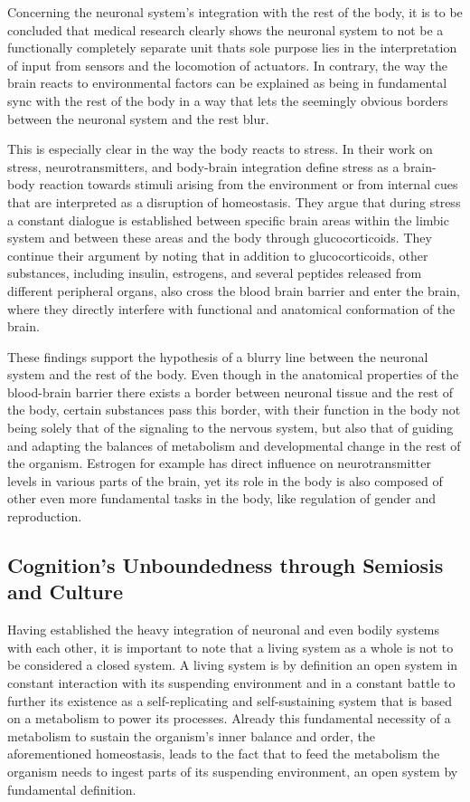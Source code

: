 Concerning the neuronal system's integration with the rest of the body, it is to be concluded that medical research clearly shows the neuronal system to not be a functionally completely separate unit thats sole purpose lies in the interpretation of input from sensors and the locomotion of actuators. In contrary, the way the brain reacts to environmental factors can be explained as being in fundamental sync with the rest of the body in a way that lets the seemingly obvious borders between the neuronal system and the rest blur.

This is especially clear in the way the body reacts to stress. In their work on stress, neurotransmitters, and body-brain integration \citet{Mora2012} define stress as a brain-body reaction towards stimuli arising from the environment or from internal cues that are interpreted as a disruption of homeostasis. They argue that during stress a constant dialogue is established between specific brain areas within the limbic system and between these areas and the body through glucocorticoids. They continue their argument by noting that in addition to glucocorticoids, other substances, including insulin, estrogens, and several peptides released from different peripheral organs, also cross the blood brain barrier and enter the brain, where they directly interfere with functional and anatomical conformation of the brain.

These findings support the hypothesis of a blurry line between the neuronal system and the rest of the body. Even though in the anatomical properties of the blood-brain barrier there exists a border between neuronal tissue and the rest of the body, certain substances pass this border, with their function in the body not being solely that of the signaling to the nervous system, but also that of guiding and adapting the balances of metabolism and developmental change in the rest of the organism. Estrogen for example has direct influence on neurotransmitter levels in various parts of the brain, yet its role in the body is also composed of other even more fundamental tasks in the body, like regulation of gender and reproduction.

\subsection{Cognition's Unboundedness through Semiosis and Culture}
Having established the heavy integration of neuronal and even bodily systems with each other, it is important to note that a living system as a whole is not to be considered a closed system. A living system is by definition an open system in constant interaction with its suspending environment and in a constant battle to further its existence as a self-replicating and self-sustaining system that is based on a metabolism to power its processes. Already this fundamental necessity of a metabolism to sustain the organism's inner balance and order, the aforementioned  homeostasis, leads to the fact that to feed the metabolism the organism needs to ingest parts of its suspending environment, an open system by fundamental definition.

